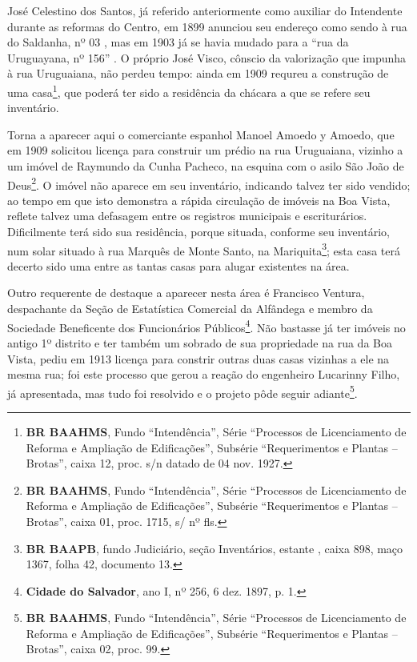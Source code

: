José Celestino dos Santos, já referido anteriormente como auxiliar do Intendente durante as reformas do Centro, em 1899 anunciou seu endereço como sendo à rua do Saldanha, nº 03 \cite[p.~477]{almanak_1899}, mas em 1903 já se havia mudado para a ``rua da Uruguayana, nº 156'' \cite[p.~345]{reis_almanak_1903}. O próprio José Visco, cônscio da valorização que impunha à rua Uruguaiana, não perdeu tempo: ainda em 1909 requreu a construção de uma casa\footnote{\textbf{BR BAAHMS}, Fundo ``Intendência'', Série ``Processos de Licenciamento de Reforma e Ampliação de Edificações'', Subsérie ``Requerimentos e Plantas -- Brotas'', caixa 12, proc. s/n datado de 04 nov. 1927.}, que poderá ter sido a residência da chácara a que se refere seu inventário.

Torna a aparecer aqui o comerciante espanhol Manoel Amoedo y Amoedo, que em 1909 solicitou licença para construir um prédio na rua Uruguaiana, vizinho a um imóvel de Raymundo da Cunha Pacheco, na esquina com o asilo São João de Deus\footnote{\textbf{BR BAAHMS}, Fundo ``Intendência'', Série ``Processos de Licenciamento de Reforma e Ampliação de Edificações'', Subsérie ``Requerimentos e Plantas -- Brotas'', caixa 01, proc. 1715, s/ nº fls.}. O imóvel não aparece em seu inventário, indicando talvez ter sido vendido; ao tempo em que isto demonstra a rápida circulação de imóveis na Boa Vista, reflete talvez uma defasagem entre os registros municipais e escriturários. Dificilmente terá sido sua residência, porque situada, conforme seu inventário, num solar situado à rua Marquês de Monte Santo, na Mariquita\footnote{\textbf{BR BAAPB}, fundo Judiciário, seção Inventários, estante , caixa 898, maço 1367, folha 42, documento 13.}; esta casa terá decerto sido uma entre as tantas casas para alugar existentes na área.

Outro requerente de destaque a aparecer nesta área é Francisco Ventura, despachante da Seção de Estatística Comercial da Alfândega \cite[p.~307]{reis_almanak_1898} e membro da Sociedade Beneficente dos Funcionários Públicos\footnote{\textbf{Cidade do Salvador}, ano I, nº 256, 6 dez. 1897, p. 1.}. Não bastasse já ter imóveis no antigo 1º distrito e ter também um sobrado de sua propriedade na rua da Boa Vista, pediu em 1913 licença para constrir outras duas casas vizinhas a ele na mesma rua; foi este processo que gerou a reação do engenheiro Lucarinny Filho, já apresentada, mas tudo foi resolvido e o projeto pôde seguir adiante\footnote{\textbf{BR BAAHMS}, Fundo ``Intendência'', Série ``Processos de Licenciamento de Reforma e Ampliação de Edificações'', Subsérie ``Requerimentos e Plantas -- Brotas'', caixa 02, proc. 99.}.

